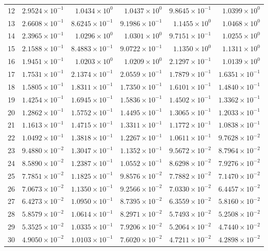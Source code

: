 \begin{table}[H]
\begin{tabular}{@{}rrrrrr@{}}
12 & $2.9524\times10^{-1}$ & $1.0434\times10^{0}$ & $1.0437\times10^{0}$ & $9.8645\times10^{-1}$ & $1.0399\times10^{0}$\\
13 & $2.6608\times10^{-1}$ & $8.6245\times10^{-1}$ & $9.1986\times10^{-1}$ & $1.1455\times10^{0}$ & $1.0468\times10^{0}$\\
14 & $2.3965\times10^{-1}$ & $1.0296\times10^{0}$ & $1.0301\times10^{0}$ & $9.7151\times10^{-1}$ & $1.0255\times10^{0}$\\
15 & $2.1588\times10^{-1}$ & $8.4883\times10^{-1}$ & $9.0722\times10^{-1}$ & $1.1350\times10^{0}$ & $1.1311\times10^{0}$\\
16 & $1.9451\times10^{-1}$ & $1.0203\times10^{0}$ & $1.0209\times10^{0}$ & $2.1297\times10^{-1}$ & $1.0139\times10^{0}$\\
17 & $1.7531\times10^{-1}$ & $2.1374\times10^{-1}$ & $2.0559\times10^{-1}$ & $1.7879\times10^{-1}$ & $1.6351\times10^{-1}$\\
18 & $1.5805\times10^{-1}$ & $1.8311\times10^{-1}$ & $1.7350\times10^{-1}$ & $1.6101\times10^{-1}$ & $1.4840\times10^{-1}$\\
19 & $1.4254\times10^{-1}$ & $1.6945\times10^{-1}$ & $1.5836\times10^{-1}$ & $1.4502\times10^{-1}$ & $1.3362\times10^{-1}$\\
20 & $1.2862\times10^{-1}$ & $1.5752\times10^{-1}$ & $1.4495\times10^{-1}$ & $1.3065\times10^{-1}$ & $1.2033\times10^{-1}$\\
21 & $1.1613\times10^{-1}$ & $1.4715\times10^{-1}$ & $1.3311\times10^{-1}$ & $1.1772\times10^{-1}$ & $1.0838\times10^{-1}$\\
22 & $1.0492\times10^{-1}$ & $1.3818\times10^{-1}$ & $1.2267\times10^{-1}$ & $1.0611\times10^{-1}$ & $9.7628\times10^{-2}$\\
23 & $9.4880\times10^{-2}$ & $1.3047\times10^{-1}$ & $1.1352\times10^{-1}$ & $9.5672\times10^{-2}$ & $8.7964\times10^{-2}$\\
24 & $8.5890\times10^{-2}$ & $1.2387\times10^{-1}$ & $1.0552\times10^{-1}$ & $8.6298\times10^{-2}$ & $7.9276\times10^{-2}$\\
25 & $7.7851\times10^{-2}$ & $1.1825\times10^{-1}$ & $9.8576\times10^{-2}$ & $7.7882\times10^{-2}$ & $7.1470\times10^{-2}$\\
26 & $7.0673\times10^{-2}$ & $1.1350\times10^{-1}$ & $9.2566\times10^{-2}$ & $7.0330\times10^{-2}$ & $6.4457\times10^{-2}$\\
27 & $6.4273\times10^{-2}$ & $1.0950\times10^{-1}$ & $8.7395\times10^{-2}$ & $6.3559\times10^{-2}$ & $5.8160\times10^{-2}$\\
28 & $5.8579\times10^{-2}$ & $1.0614\times10^{-1}$ & $8.2971\times10^{-2}$ & $5.7493\times10^{-2}$ & $5.2508\times10^{-2}$\\
29 & $5.3525\times10^{-2}$ & $1.0335\times10^{-1}$ & $7.9206\times10^{-2}$ & $5.2064\times10^{-2}$ & $4.7440\times10^{-2}$\\
30 & $4.9050\times10^{-2}$ & $1.0103\times10^{-1}$ & $7.6020\times10^{-2}$ & $4.7211\times10^{-2}$ & $4.2898\times10^{-2}$\\
\bottomrule
\end{tabular}
\end{table}

